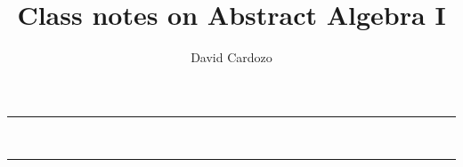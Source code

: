 \documentclass[notitlepage]{article}
\author{David Cardozo}
\title{Class notes on Abstract Algebra I}
\begin{document}



\noindent\rule{\textwidth}{1pt}\\[-0.1cm]


\noindent\rule{\textwidth}{1pt}\\[-0.1cm]
	
	
\end{document}
